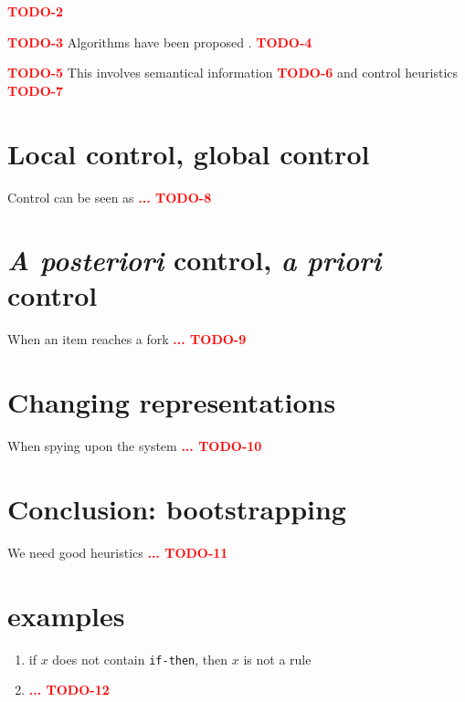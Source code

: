 \documentclass[11pt,a4paper,svgnames]{article}
\begin{document}
  {\textcolor{red}{\textbf{TODO-2}}}

  {\textcolor{red}{\textbf{TODO-3}}}
  Algorithms have been proposed \cite{Forgy-Rete-1982}.
  {\textcolor{red}{\textbf{TODO-4}}}


  {\textcolor{red}{\textbf{TODO-5}}}
  This involves semantical information
  {\textcolor{red}{\textbf{TODO-6}}}
  and control heuristics \cite{Lenat-Heuristics-1982,Lenat-Eurisko-1983}
  {\textcolor{red}{\textbf{TODO-7}}}

  \section{Local control, global control}
  \label{sec:loc-glob-control}

  Control can be seen as
  {\textcolor{red}{\textbf{... TODO-8}}}


  \section{\textit{A posteriori} control, \textit{a priori} control}
  \label{sec:posteriori-priori-control}
When an item reaches a fork
  {\textcolor{red}{\textbf{... TODO-9}}}

  \section{Changing representations}
  \label{sec:changing-repr}
  When spying upon the system
  {\textcolor{red}{\textbf{... TODO-10}}}

  \section{Conclusion: bootstrapping}
  \label{sec:concl-bootstrap}
  We need good heuristics
  {\textcolor{red}{\textbf{... TODO-11}}}

  \section*{examples}

  \begin{enumerate}
  \item if $x$ does not contain \texttt{if-then}, then $x$ is not a rule
    \item
      {\textcolor{red}{\textbf{... TODO-12}}}

  \end{enumerate}

\clearpage
{}



\end{document}
